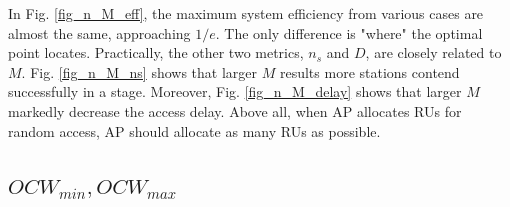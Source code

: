 \documentclass[journal]{IEEEtran}
\begin{document}
In Fig. \ref{fig_n_M_eff}, the maximum system efficiency from various cases are almost the same, approaching $1/e$. 
The only difference is "where" the optimal point locates. 
Practically, the other two metrics, $n_s$ and $D$, are closely related to $M$.
Fig. \ref{fig_n_M_ns} shows that larger $M$ results more stations contend successfully in a stage.
Moreover, Fig. \ref{fig_n_M_delay} shows that larger $M$ markedly decrease the access delay. 
Above all, when AP allocates RUs for random access, AP should allocate as many RUs as possible.



\subsection{$OCW_{min}, OCW_{max}$}
\label{contend_window}
\end{document}

